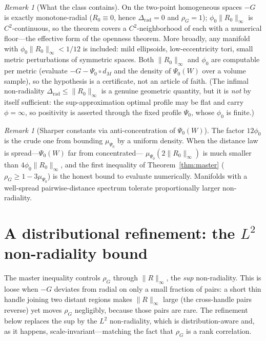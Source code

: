 \documentclass[11pt]{article}
\theoremstyle{remark}
\newtheorem{remark}[theorem]{Remark}
\newcommand{\Rem}{R}
\newcommand{\dM}{d_M}
\newcommand{\rhoG}{\rho_G}
\begin{document}
\begin{remark}[What the class contains]
On the two-point homogeneous spaces $-G$ is exactly monotone-radial ($\Rem_0\equiv0$,
hence $\Delta_{\mathrm{rad}}=0$ and $\rhoG=1$); $\phi_0\lVert\Rem_0\rVert_\infty$ is
$C^2$-continuous, so the theorem covers a $C^2$-neighborhood of each with a numerical
floor---the effective form of the openness theorem. More broadly, any manifold with
$\phi_0\lVert\Rem_0\rVert_\infty<1/12$ is included: mild ellipsoids, low-eccentricity
tori, small metric perturbations of symmetric spaces. Both $\lVert\Rem_0\rVert_\infty$ and
$\phi_0$ are computable per metric (evaluate $-G-\Psi_0\circ\dM$ and the density of
$\Psi_0(W)$ over a volume sample), so the hypothesis is a certificate, not an article of
faith. (The infimal non-radiality $\Delta_{\mathrm{rad}}\le\lVert\Rem_0\rVert_\infty$ is a
genuine geometric quantity, but it is \emph{not} by itself sufficient: the sup-approximation
optimal profile may be flat and carry $\phi=\infty$, so positivity is asserted through the
fixed profile $\Psi_0$, whose $\phi_0$ is finite.)
\end{remark}

\begin{remark}[Sharper constants via anti-concentration of $\Psi_0(W)$]
The factor $12\phi_0$ is the crude one from bounding $\mu_{\Psi_0}$ by a uniform density.
When the distance law is spread---$\Psi_0(W)$ far from concentrated---%
$\mu_{\Psi_0}(2\lVert\Rem_0\rVert_\infty)$ is much smaller than
$4\phi_0\lVert\Rem_0\rVert_\infty$, and the first inequality of Theorem~\ref{thm:master}
($\rhoG\ge1-3\mu_{\Psi_0}$) is the honest bound to evaluate numerically. Manifolds with a
well-spread pairwise-distance spectrum tolerate proportionally larger non-radiality.
\end{remark}

\section{A distributional refinement: the $L^2$ non-radiality bound}

The master inequality controls $\rhoG$ through $\lVert\Rem\rVert_\infty$, the \emph{sup}
non-radiality. This is loose when $-G$ deviates from radial on only a small fraction of
pairs: a short thin handle joining two distant regions makes $\lVert\Rem\rVert_\infty$ large
(the cross-handle pairs reverse) yet moves $\rhoG$ negligibly, because those pairs are rare.
The refinement below replaces the sup by the \emph{$L^2$} non-radiality, which is
distribution-aware and, as it happens, scale-invariant---matching the fact that $\rhoG$ is a
rank correlation.
\end{document}
